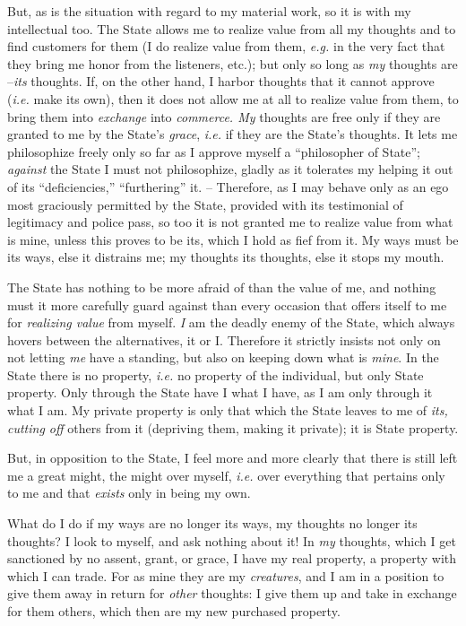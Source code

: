 \documentclass[12pt,a4paper]{book}
\begin{document}
But, as is the situation with regard to my material work, so it is with my 
intellectual too. The State allows me to realize value from all my thoughts 
and to find customers for them (I do realize value from them, \textit{e.g.} 
in the very fact that they bring me honor from the listeners, etc.); but only 
so long as \textit{my} thoughts are --\textit{its} thoughts. If, on the other 
hand, I harbor thoughts that it cannot approve (\textit{i.e.} make its own), 
then it does not allow me at all to realize value from them, to bring them 
into \textit{exchange} into \textit{commerce. My} thoughts are free only if 
they are granted to me by the State's \textit{grace}, \textit{i.e.} if they 
are the State's thoughts. It lets me philosophize freely only so far as I 
approve myself a ``philosopher of State''; \textit{against} the State I must 
not philosophize, gladly as it tolerates my helping it out of its 
``deficiencies,'' ``furthering'' it. -- Therefore, as I may behave only as 
an ego most graciously permitted by the State, provided with its testimonial 
of legitimacy and police pass, so too it is not granted me to realize value 
from what is mine, unless this proves to be its, which I hold as fief from it. 
My ways must be its ways, else it distrains me; my thoughts its thoughts, else 
it stops my mouth.

The State has nothing to be more afraid of than the value of me, and nothing 
must it more carefully guard against than every occasion that offers itself to 
me for \textit{realizing value} from myself. \textit{I} am the deadly enemy of 
the State, which always hovers between the alternatives, it or I. Therefore it 
strictly insists not only on not letting \textit{me} have a standing, but also 
on keeping down what is \textit{mine}. In the State there is no property, 
\textit{i.e.} no property of the individual, but only State property. Only 
through the State have I what I have, as I am only through it what I am. My 
private property is only that which the State leaves to me of \textit{its, 
cutting off} others from it (depriving them, making it private); it is State 
property.

But, in opposition to the State, I feel more and more clearly that there is 
still left me a great might, the might over myself, \textit{i.e.} over 
everything that pertains only to me and that \textit{exists} only in being my 
own.

What do I do if my ways are no longer its ways, my thoughts no longer its 
thoughts? I look to myself, and ask nothing about it! In \textit{my} thoughts, 
which I get sanctioned by no assent, grant, or grace, I have my real property, 
a property with which I can trade. For as mine they are my \textit{creatures}, 
and I am in a position to give them away in return for \textit{other} 
thoughts: I give them up and take in exchange for them others, which then are 
my new purchased property.
\end{document}
